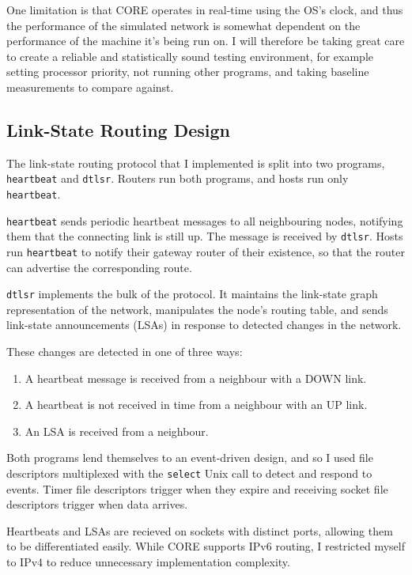 \documentclass[10pt,twoside,a4paper]{article}
\begin{document}
One limitation is that CORE operates in real-time using the OS's clock, and thus the performance of the simulated network is somewhat dependent on the performance of the machine it's being run on. I will therefore be taking great care to create a reliable and statistically sound testing environment, for example setting processor priority, not running other programs, and taking baseline measurements to compare against.

\subsection{Link-State Routing Design}

The link-state routing protocol that I implemented is split into two programs, \texttt{heartbeat} and \texttt{dtlsr}. Routers run both programs, and hosts run only \texttt{heartbeat}.

\texttt{heartbeat} sends periodic heartbeat messages to all neighbouring nodes, notifying them that the connecting link is still up. The message is received by \texttt{dtlsr}. Hosts run \texttt{heartbeat} to notify their gateway router of their existence, so that the router can advertise the corresponding route.

\texttt{dtlsr} implements the bulk of the protocol. It maintains the link-state graph representation of the network, manipulates the node's routing table, and sends link-state announcements (LSAs) in response to detected changes in the network.

These changes are detected in one of three ways:
\begin{enumerate}
	\item
	A heartbeat message is received from a neighbour with a DOWN link.
	
	\item
	A heartbeat is not received in time from a neighbour with an UP link.
	
	\item
	An LSA is received from a neighbour.
\end{enumerate}

Both programs lend themselves to an event-driven design, and so I used file descriptors multiplexed with the \texttt{select} Unix call to detect and respond to events. Timer file descriptors trigger when they expire and receiving socket file descriptors trigger when data arrives.

Heartbeats and LSAs are recieved on sockets with distinct ports, allowing them to be differentiated easily. While CORE supports IPv6 routing, I restricted myself to IPv4 to reduce unnecessary implementation complexity.
\end{document}
